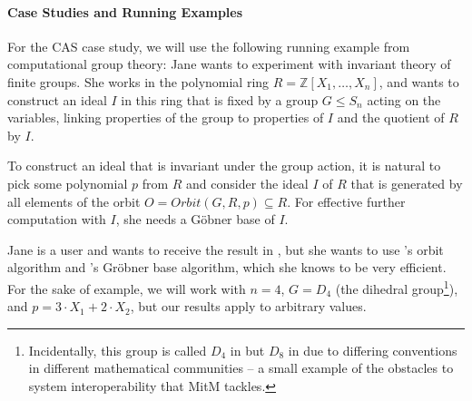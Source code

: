 \paragraph{Case Studies and Running Examples}
For the CAS case study, we will use the following running example from computational group theory: Jane wants to experiment with invariant theory of finite groups.
She works in the polynomial ring $R=\mathbb{Z}[X_1,\ldots,X_n]$, and wants to construct an ideal $I$ in this ring that is fixed by a group $G \leq S_n$ acting on the variables, linking properties of the group to properties of $I$ and the quotient of $R$ by $I$.

To construct an ideal that is invariant
under the group action, it is natural to pick some polynomial $p$ from $R$
and consider the ideal $I$ of $R$ that is generated by all elements of the orbit
$O=Orbit(G,R,p)\subseteq R$.
For effective further computation with $I$, she needs a G\"obner base of $I$.

Jane is a \Sage user and wants to receive the result in \Sage, but she wants to
use \GAP's orbit algorithm and \Singular's Gr\"obner base algorithm, which she
knows to be very efficient. For the sake of example, we will work with $n=4$,
$G=D_4$ (the dihedral group\footnote{Incidentally, this group is called $D_4$ in
\Sage but $D_8$ in \GAP due to differing conventions in different mathematical
communities -- a small example of the obstacles to system interoperability that
MitM tackles.}), and $p=3\cdot X_1+2\cdot X_2$, but our results apply to
arbitrary values.

